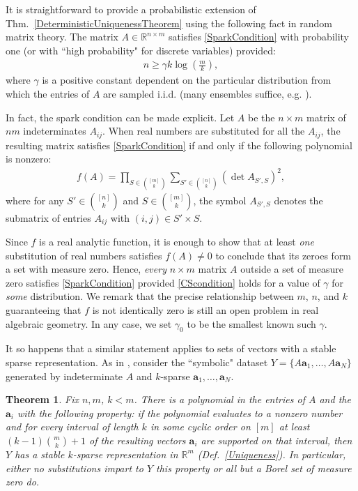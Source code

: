 \documentclass[journal, twocolumn]{IEEEtran}
\newtheorem{theorem}{Theorem}
\begin{document}
It is straightforward to provide a probabilistic extension of Thm.~\ref{DeterministicUniquenessTheorem} using the following fact in random matrix theory.  The matrix $A \in \mathbb{R}^{n \times m}$ satisfies \eqref{SparkCondition} with probability one (or with ``high probability" for discrete variables) 
provided:
\begin{align}\label{CScondition}
n \geq \gamma k\log\left(\frac{m}{k}\right),
\end{align}
where $\gamma$ is a positive constant dependent on the particular distribution from which the entries of $A$ are sampled i.i.d. (many ensembles suffice, e.g. \cite[Sec.~4]{Baraniuk08}). 

In fact, the spark condition can be made explicit.  Let $A$  be the $n \times m$ matrix of $nm$ indeterminates $A_{ij}$. When real numbers are substituted for all the $A_{ij}$, the resulting matrix satisfies \eqref{SparkCondition} if and only if the following polynomial is nonzero:
\begin{align*}
f(A) = \prod_{S \in {[m] \choose k}} \sum_{S' \in {[n] \choose k}} (\det A_{S',S})^2,
\end{align*}
%
where for any $S' \in {[n] \choose k}$ and $S \in {[m] \choose k}$, the symbol $A_{S',S}$ denotes the submatrix of entries $A_{ij}$ with $(i,j) \in S' \times S$. 

Since $f$ is a real analytic function, it is enough to show that at least \emph{one} substitution of real numbers satisfies $f(A) \neq 0$ to conclude that its zeroes form a set with measure zero. Hence, \emph{every} $n \times m$ matrix $A$ outside a set of measure zero satisfies \eqref{SparkCondition} provided \eqref{CScondition} holds for a value of $\gamma$ for \emph{some} distribution. We remark that the precise relationship between $m$, $n$, and $k$ guaranteeing that $f$ is not identically zero is still an open problem in real algebraic geometry. In any case, we set $\gamma_0$ to be the smallest known such $\gamma$.

It so happens that a similar statement applies to sets of vectors with a stable sparse representation. As in \cite[Sec.~IV]{Hillar15}, consider the ``symbolic" dataset $Y = \{A\mathbf{a}_1,\ldots,A \mathbf{a}_N\}$ generated by indeterminate $A$ and $k$-sparse $\mathbf{a}_1, \ldots, \mathbf{a}_N$. 
\begin{theorem}\label{robustPolythm} 
Fix $n, m$, $k < m$. There is a polynomial in the entries of $A$ and the $\mathbf{a}_i$ with the following property:  if the polynomial evaluates to a nonzero number and for every interval of length $k$ in some cyclic order on $[m]$ at least \mbox{$(k-1){m \choose k}+1$} of the resulting vectors $\mathbf{a}_i$ are supported on that interval, then $Y$ has a stable $k$-sparse representation in $\mathbb{R}^m$ (Def.~\ref{Uniqueness}). In particular, either no substitutions impart to $Y$ this property or all but a Borel set of measure zero do. 
\end{theorem}
\end{document}
